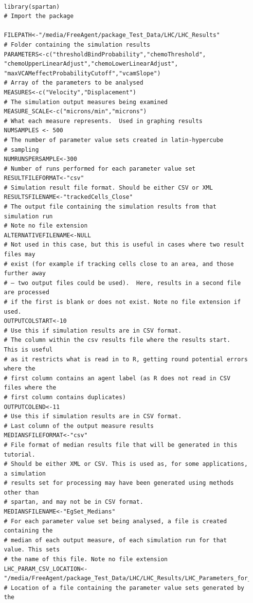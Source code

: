\documentclass[a4paper,11pt]{article}
\begin{document}
\begin{enumerate}
\newpage

\begin{verbatim}

library(spartan)
# Import the package

FILEPATH<-"/media/FreeAgent/package_Test_Data/LHC/LHC_Results"
# Folder containing the simulation results
PARAMETERS<-c("thresholdBindProbability","chemoThreshold",
"chemoUpperLinearAdjust","chemoLowerLinearAdjust",
"maxVCAMeffectProbabilityCutoff","vcamSlope")
# Array of the parameters to be analysed
MEASURES<-c("Velocity","Displacement")
# The simulation output measures being examined
MEASURE_SCALE<-c("microns/min","microns")
# What each measure represents.  Used in graphing results
NUMSAMPLES <- 500
# The number of parameter value sets created in latin-hypercube
# sampling
NUMRUNSPERSAMPLE<-300
# Number of runs performed for each parameter value set
RESULTFILEFORMAT<-"csv"
# Simulation result file format. Should be either CSV or XML
RESULTSFILENAME<-"trackedCells_Close"
# The output file containing the simulation results from that simulation run
# Note no file extension
ALTERNATIVEFILENAME<-NULL
# Not used in this case, but this is useful in cases where two result files may 
# exist (for example if tracking cells close to an area, and those further away 
# – two output files could be used).  Here, results in a second file are processed 
# if the first is blank or does not exist. Note no file extension if used.
OUTPUTCOLSTART<-10
# Use this if simulation results are in CSV format. 
# The column within the csv results file where the results start.  This is useful 
# as it restricts what is read in to R, getting round potential errors where the 
# first column contains an agent label (as R does not read in CSV files where the 
# first column contains duplicates)
OUTPUTCOLEND<-11
# Use this if simulation results are in CSV format. 
# Last column of the output measure results
MEDIANSFILEFORMAT<-"csv"
# File format of median results file that will be generated in this tutorial. 
# Should be either XML or CSV. This is used as, for some applications, a simulation 
# results set for processing may have been generated using methods other than 
# spartan, and may not be in CSV format.
MEDIANSFILENAME<-"EgSet_Medians"
# For each parameter value set being analysed, a file is created containing the 
# median of each output measure, of each simulation run for that value. This sets 
# the name of this file. Note no file extension
LHC_PARAM_CSV_LOCATION<-
"/media/FreeAgent/package_Test_Data/LHC/LHC_Results/LHC_Parameters_for_Runs.csv"
# Location of a file containing the parameter value sets generated by the 

\end{verbatim}
\end{enumerate}
\end{document}
